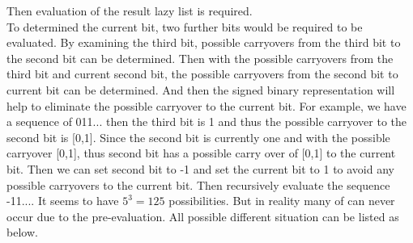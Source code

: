 \documentclass[12pt,twoside,notitlepage]{report}
\begin{document}
Then evaluation of the result lazy list is required.\\
To determined the current bit, two further bits would be required to be evaluated. By examining the third bit, possible carryovers from the third bit to the second bit can be determined. Then with the possible carryovers from the third bit and current second bit, the possible carryovers from the second bit to current bit can be determined.  And then the signed binary representation will help to eliminate the possible carryover to the current bit. For example, we have a sequence of 011... then the third bit is 1 and thus the possible carryover to the second bit is [0,1]. Since the second bit is currently one and with the possible carryover [0,1], thus second bit has a possible carry over of [0,1] to the current bit. Then we can set second bit to -1 and set the current bit to 1 to avoid any possible carryovers to the current bit. Then recursively evaluate the sequence -11.... It seems to have $5^{3}=125$ possibilities. But in reality many of can never occur due to the pre-evaluation.  All possible different situation can be listed as below.\\
\end{document}
